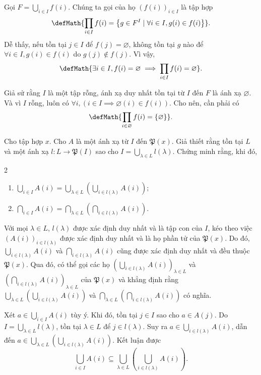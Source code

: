 Gọi $F = \bigcup_{i \in I}f(i)$. Chúng ta gọi  của họ $(f(i))_{i \in I}$ là tập hợp
$$
\defMath{\prod_{i \in I}f(i) = \left\{g \in F^I \mid \forall i \in I, g(i) \in f(i)\right\}}.
$$
Dễ thấy, nếu tồn tại $j \in I$ để $f(j) = \varnothing$, không tồn tại $g$ nào để $\forall i \in I, g(i) \in f(i)$ do $g(j) \notin f(j)$. Vì vậy, 
\begin{equation*}
   \defMath{\exists i \in I, f(i) = \varnothing \implies \prod_{i \in I}f(i) = \varnothing}.
\end{equation*}

Giả sử rằng $I$ là một tập rỗng, ánh xạ duy nhất tồn tại từ $I$ đến $F$ là ánh xạ $\varnothing$. Và vì $I$ rỗng, luôn có $\forall i, \left(i \in I \implies \varnothing(i) \in f(i)\right)$. Cho nên, cần phải có $$
   \defMath{\prod_{i \in \varnothing} f(i) = \{\varnothing\}}.
$$

\exercise Cho tập hợp $x$. Cho $A$ là một ánh xạ từ $I$ đến $\mathfrak{P}(x)$. Giả thiết rằng tồn tại $L$ và một ánh xạ $l: L \to \mathfrak{P}(I)$ sao cho $I = \bigcup_{\lambda \in L}l(\lambda)$. Chứng minh rằng, khi đó,
\begin{multicols}{2}
   \begin{enumerate}
      \item $\bigcup_{i \in I} A(i) = \bigcup_{\lambda \in L} \left(\bigcup_{i \in l(\lambda)} A(i)\right)$;
      \item $\bigcap_{i \in I} A(i) = \bigcap_{\lambda \in L} \left(\bigcap_{i \in l(\lambda)} A(i)\right)$.
   \end{enumerate}
\end{multicols}

\solution

Với mọi $\lambda \in L$, $l(\lambda)$ được xác định duy nhất và là tập con của $I$, kéo theo việc $(A(i))_{i \in l(\lambda)}$ được xác định duy nhất và là họ phần tử của $\mathfrak{P}(x)$. Do đó, $\bigcup_{i \in l(\lambda)} A(i)$ và $\bigcap_{i \in l(\lambda)} A(i)$ cũng được xác định duy nhất và đều thuộc $\mathfrak{P}(x)$. Qua đó, có thể gọi các họ $\left(\bigcup_{i \in l(\lambda)} A(i)\right)_{\lambda \in L}$ và $\left(\bigcap_{i \in l(\lambda)} A(i)\right)_{\lambda \in L}$ của $\mathfrak{P}(x)$ và khẳng định rằng $\bigcup_{\lambda \in L} \left(\bigcup_{i \in l(\lambda)} A(i)\right)$ và $\bigcap_{\lambda \in L} \left(\bigcap_{i \in l(\lambda)} A(i)\right)$ có nghĩa.

\resetSubexercise Xét $a \in \bigcup_{i \in I} A(i)$ tùy ý. Khi đó, tồn tại $j \in I$ sao cho $a \in A(j)$. Do $I = \bigcup_{\lambda \in L} l(\lambda)$, tồn tại $\lambda \in L$ để $j \in l(\lambda)$. Suy ra $a \in \bigcup_{i \in l(\lambda)} A(i)$, dẫn đến $a \in \bigcup_{\lambda \in L} \left(\bigcup_{i \in l(\lambda)} A(i)\right)$. Kết luận được \begin{equation*}
   \bigcup_{i \in I} A(i) \subseteq \bigcup_{\lambda \in L} \left(\bigcup_{i \in l(\lambda)} A(i)\right).
\end{equation*}

